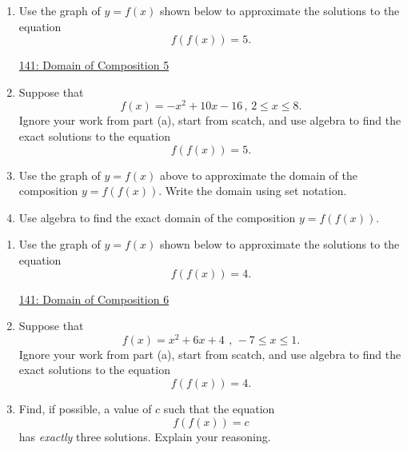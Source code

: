 \documentclass{ximera}
\begin{document}
\begin{example}  \label{Eerg4t4r5}
\begin{enumerate}

\item Use the graph of $y=f(x)$ shown below to approximate the solutions to the equation
\[
    f(f(x)) = 5 .
\]

\begin{onlineOnly}
    \begin{center}
\end{center}
\end{onlineOnly}

\href{https://www.desmos.com/calculator/d6zcmotesc}{141: Domain of Composition 5}

\item Suppose that 
\[
       f(x) = -x^2 +10x - 16 \, , \, 2\leq x \leq 8 .
\]
Ignore your work from part (a), start from scatch, and use algebra to find the exact solutions to the equation 
\[
    f(f(x)) = 5.
\]

\item Use the graph of $y=f(x)$ above to approximate the domain of the composition $y=f(f(x))$. Write the domain using set notation.

\item Use algebra to find the exact domain of the composition $y=f(f(x))$.

\end{enumerate}
\end{example}


\begin{question} \label{Q32443ggr}
\begin{enumerate}
\item Use the graph of $y=f(x)$ shown below to approximate the solutions to the equation
\[
    f(f(x)) = 4 .
\]

\begin{onlineOnly}
    \begin{center}
\end{center}
\end{onlineOnly}

\href{https://www.desmos.com/calculator/hbegdhlhbb}{141: Domain of Composition 6}

\item Suppose that 
\[
       f(x) = x^{2}+6x+4\  \, , \, -7\leq x\leq 1  .
\]
Ignore your work from part (a), start from scatch, and use algebra to find the exact solutions to the equation 
\[
    f(f(x)) = 4.
\]

\item Find, if possible, a value of $c$ such that the equation
\[
    f(f(x))=c
\]
has \emph{exactly} three solutions. Explain your reasoning.

\end{enumerate}

\end{question}
\end{document}
